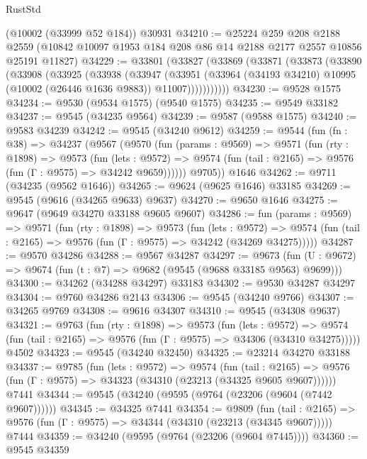 \begin{lexlean}{RustStd}
\begin{coremodule}
    (@10002 (@33999 @52 @184))
    @30931
@34210 := @25224
    @259
    @208
    @2188
    @2559
    (@10842 @10097 @1953 @184 @208 @86 @14 @2188 @2177 @2557 @10856 @25191 @11827)
@34229 := @33801
    (@33827
      (@33869
        (@33871
          (@33873
            (@33890
              (@33908
                (@33925
                  (@33938
                    (@33947
                      (@33951
                        (@33964
                          (@34193 @34210)
                          @10995
                          (@10002 (@26446 @1636 @9883))
                          @11007)))))))))))
@34230 := @9528 @1575
@34234 := @9530 (@9534 @1575) (@9540 @1575)
@34235 := @9549 @33182
@34237 := @9545 (@34235 @9564)
@34239 := @9587 (@9588 @1575)
@34240 := @9583 @34239
@34242 := @9545 (@34240 @9612)
@34259 := @9544
    (fun (fn : @38) =>
    @34237
      (@9567
        (@9570
          (fun (params : @9569) =>
          @9571
            (fun (rty : @1898) =>
            @9573
              (fun (lets : @9572) =>
              @9574 (fun (tail : @2165) => @9576 (fun (Γ : @9575) => @34242 @9659))))))
        @9705))
    @1646
@34262 := @9711 (@34235 (@9562 @1646))
@34265 := @9624 (@9625 @1646) @33185
@34269 := @9545 (@9616 (@34265 @9633) @9637)
@34270 := @9650 @1646
@34275 := @9647 (@9649 @34270 @33188 @9605 @9607)
@34286 := fun (params : @9569) =>
  @9571
    (fun (rty : @1898) =>
    @9573
      (fun (lets : @9572) =>
      @9574 (fun (tail : @2165) => @9576 (fun (Γ : @9575) => @34242 (@34269 @34275)))))
@34287 := @9570 @34286
@34288 := @9567 @34287
@34297 := @9673
    (fun (U : @9672) => @9674 (fun (t : @7) => @9682 (@9545 (@9688 @33185 @9563) @9699)))
@34300 := @34262 (@34288 @34297) @33183
@34302 := @9530 @34287 @34297
@34304 := @9760 @34286 @2143
@34306 := @9545 (@34240 @9766)
@34307 := @34265 @9769
@34308 := @9616 @34307
@34310 := @9545 (@34308 @9637)
@34321 := @9763
    (fun (rty : @1898) =>
    @9573
      (fun (lets : @9572) =>
      @9574 (fun (tail : @2165) => @9576 (fun (Γ : @9575) => @34306 (@34310 @34275)))))
    @4502
@34323 := @9545 (@34240 @32450)
@34325 := @23214 @34270 @33188
@34337 := @9785
    (fun (lets : @9572) =>
    @9574
      (fun (tail : @2165) =>
      @9576 (fun (Γ : @9575) => @34323 (@34310 (@23213 (@34325 @9605 @9607))))))
    @7441
@34344 := @9545 (@34240 (@9595 (@9764 (@23206 (@9604 (@7442 @9607))))))
@34345 := @34325 @7441
@34354 := @9809
    (fun (tail : @2165) => @9576 (fun (Γ : @9575) => @34344 (@34310 (@23213 (@34345 @9607)))))
    @7444
@34359 := @34240 (@9595 (@9764 (@23206 (@9604 @7445))))
@34360 := @9545 @34359

\end{coremodule}
\end{lexlean}
